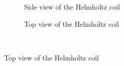 \begin{figure}[H]
		\centering
          \begin{subfigure}{0.49\textwidth}
                  \flushleft
                  \caption{Side view of the Helmholtz coil}\label{fig:Coil_Full}
          \end{subfigure}
        \begin{subfigure}{0.49\textwidth}
                \flushright
                \caption{Top view of the Helmholtz coil}\label{fig:Coil_Top}
        \end{subfigure}
        \\
        

\end{figure}
